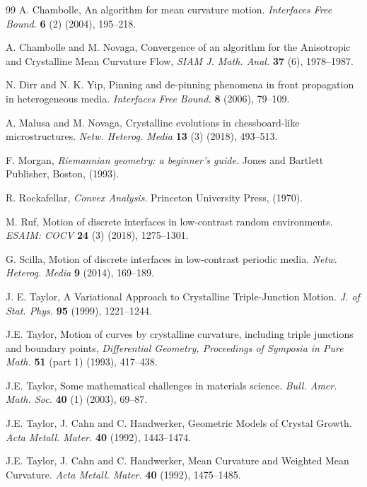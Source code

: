 \documentclass{interact}
\numberwithin{equation}{section}
\theoremstyle{definition}
\begin{document}
\begin{thebibliography} {99}
 A. Chambolle, An algorithm for mean curvature motion. \emph{Interfaces Free Bound.} {\bf 6} (2) (2004), 195--218.

 A. Chambolle and M. Novaga, Convergence of an algorithm for the Anisotropic and Crystalline Mean Curvature Flow, \emph{SIAM J. Math. Anal.} {\bf 37} (6), 1978--1987.

 N. Dirr and N. K. Yip, Pinning and de-pinning phenomena in front propagation in heterogeneous media. \emph{Interfaces Free Bound.} {\bf 8} (2006), 79--109.

 A. Malusa and M. Novaga, Crystalline evolutions in chessboard-like microstructures. \emph{Netw. Heterog. Media} {\bf 13} (3) (2018), 493--513. 

 F. Morgan, \emph{Riemannian geometry: a beginner's guide.} Jones and Bartlett Publisher, Boston, (1993).

 R. Rockafellar, \emph{Convex Analysis}. Princeton University Press, (1970).

 M. Ruf, Motion of discrete interfaces in low-contrast random environments. \emph{ESAIM: COCV} {\bf 24} (3) (2018), 1275--1301. 

 G. Scilla, Motion of discrete interfaces in low-contrast periodic media. \emph{Netw. Heterog. Media} {\bf 9} (2014), 169--189.

 J. E. Taylor, A Variational Approach to Crystalline Triple-Junction Motion. \emph{J. of Stat. Phys.} {\bf 95} (1999), 1221--1244.

 J.E. Taylor, Motion of curves by crystalline curvature,
including triple junctions and boundary points, {\em Differential
Geometry, Proceedings of Symposia in Pure Math. }{\bf 51} (part 1) (1993), 417--438.

 J.E. Taylor, Some mathematical challenges in materials science. \emph{Bull. Amer. Math. Soc.} {\bf 40} (1) (2003), 69--87.

 J.E. Taylor, J. Cahn and C. Handwerker, Geometric Models of Crystal Growth. \emph{Acta Metall. Mater.}
{\bf 40} (1992), 1443--1474.

 J.E. Taylor, J. Cahn and C. Handwerker, Mean Curvature and Weighted Mean Curvature. \emph{Acta Metall.
Mater.} {\bf 40} (1992), 1475--1485.

\end{thebibliography}
\end{document}
